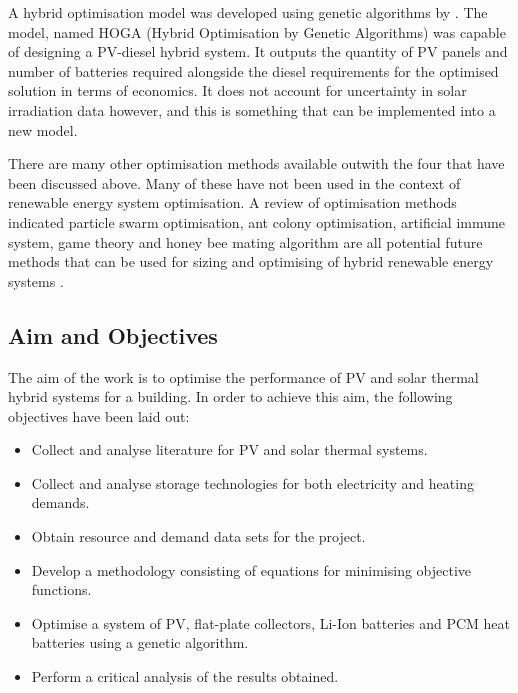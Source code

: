 A hybrid optimisation model was developed using genetic algorithms by \cite{DUFOLOPEZ200533}. The model, named HOGA (Hybrid Optimisation by Genetic Algorithms) was capable of designing a PV-diesel hybrid system. It outputs the quantity of PV panels 
and number of batteries required alongside the diesel requirements for the 
optimised solution in terms of economics. It does not account for uncertainty 
in solar irradiation data however, and this is something that can be 
implemented into a new model.

There are many other optimisation methods available outwith the four 
that have been discussed above. Many of these have not been used in 
the context of renewable energy system optimisation.  A review of 
optimisation methods indicated particle swarm optimisation, ant 
colony optimisation, artificial immune system, game theory and honey 
bee mating algorithm are all potential future methods that can be used 
for sizing and optimising of hybrid renewable energy systems \cite{ERDINC20121412} . 

\subsection{Aim and Objectives}

The aim of the work is to optimise the performance of PV and solar thermal hybrid systems for a building. In order to achieve this aim, the following objectives have been laid out: 
\begin{itemize}

\item Collect and analyse literature for PV and solar thermal systems. 
\item Collect and analyse storage technologies for both electricity and heating demands. 
\item Obtain resource and demand data sets for the project. 
\item Develop a methodology consisting of equations for minimising objective functions.
\item Optimise a system of PV, flat-plate collectors, Li-Ion batteries and PCM heat batteries using a genetic algorithm.
\item Perform a critical analysis of the results obtained.
\end{itemize}



